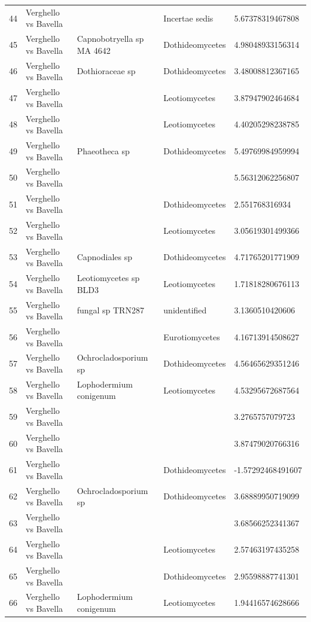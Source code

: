 \documentclass[12pt]{article}\usepackage[]{graphicx}\usepackage[]{color}
\numberwithin{figure}{section}
\begin{document}
\begin{table}[ht]
\begin{tabular}{lllll}
  44 & Verghello vs Bavella &  & Incertae sedis & 5.67378319467808 \\ 
  45 & Verghello vs Bavella & Capnobotryella sp MA 4642 & Dothideomycetes & 4.98048933156314 \\ 
  46 & Verghello vs Bavella & Dothioraceae sp & Dothideomycetes & 3.48008812367165 \\ 
  47 & Verghello vs Bavella &  & Leotiomycetes & 3.87947902464684 \\ 
  48 & Verghello vs Bavella &  & Leotiomycetes & 4.40205298238785 \\ 
  49 & Verghello vs Bavella & Phaeotheca sp & Dothideomycetes & 5.49769984959994 \\ 
  50 & Verghello vs Bavella &  &  & 5.56312062256807 \\ 
  51 & Verghello vs Bavella &  & Dothideomycetes & 2.551768316934 \\ 
  52 & Verghello vs Bavella &  & Leotiomycetes & 3.05619301499366 \\ 
  53 & Verghello vs Bavella & Capnodiales sp & Dothideomycetes & 4.71765201771909 \\ 
  54 & Verghello vs Bavella & Leotiomycetes sp BLD3 & Leotiomycetes & 1.71818280676113 \\ 
  55 & Verghello vs Bavella & fungal sp TRN287 & unidentified & 3.1360510420606 \\ 
  56 & Verghello vs Bavella &  & Eurotiomycetes & 4.16713914508627 \\ 
  57 & Verghello vs Bavella & Ochrocladosporium sp & Dothideomycetes & 4.56465629351246 \\ 
  58 & Verghello vs Bavella & Lophodermium conigenum & Leotiomycetes & 4.53295672687564 \\ 
  59 & Verghello vs Bavella &  &  & 3.2765757079723 \\ 
  60 & Verghello vs Bavella &  &  & 3.87479020766316 \\ 
  61 & Verghello vs Bavella &  & Dothideomycetes & -1.57292468491607 \\ 
  62 & Verghello vs Bavella & Ochrocladosporium sp & Dothideomycetes & 3.68889950719099 \\ 
  63 & Verghello vs Bavella &  &  & 3.68566252341367 \\ 
  64 & Verghello vs Bavella &  & Leotiomycetes & 2.57463197435258 \\ 
  65 & Verghello vs Bavella &  & Dothideomycetes & 2.95598887741301 \\ 
  66 & Verghello vs Bavella & Lophodermium conigenum & Leotiomycetes & 1.94416574628666 \\ 

\end{tabular}
\end{table}
\end{document}
